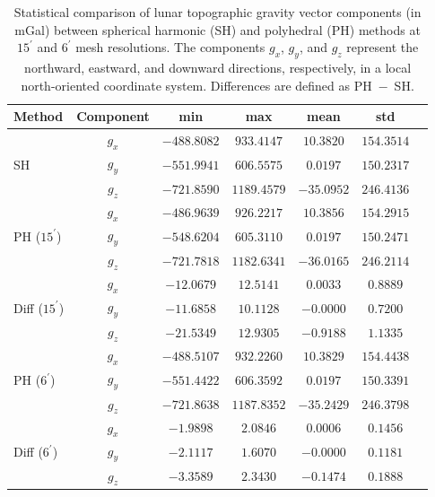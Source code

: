 \documentclass{seg}
\begin{document}
\clearpage
\begin{table}[h!]
\centering
\caption{Statistical comparison of lunar topographic gravity vector components (in mGal) between spherical harmonic (SH) and polyhedral (PH) methods at $15^{\prime}$ and $6^{\prime}$ mesh resolutions. The components $g_x$, $g_y$, and $g_z$ represent the northward, eastward, and downward directions, respectively, in a local north-oriented coordinate system. Differences are defined as PH~$-$~SH.}
\label{tab:Moon_SH_PH_comparison}
\begin{tabular}{lcccccc}
\toprule
Method & Component & min & max & mean & std \\
\midrule
\multirow{3}{*}{SH} 
   & $g_x$ & $-488.8082$ & $933.4147$ & $10.3820$ & $154.3514$ \\
   & $g_y$ & $-551.9941$ & $606.5575$ & $0.0197$  & $150.2317$ \\
   & $g_z$ & $-721.8590$ & $1189.4579$ & $-35.0952$ & $246.4136$ \\
\midrule
\multirow{3}{*}{PH ($15^{\prime}$)} 
   & $g_x$ & $-486.9639$ & $926.2217$ & $10.3856$ & $154.2915$ \\
   & $g_y$ & $-548.6204$ & $605.3110$ & $0.0197$  & $150.2471$ \\
   & $g_z$ & $-721.7818$ & $1182.6341$ & $-36.0165$ & $246.2114$ \\
\midrule
\multirow{3}{*}{Diff ($15^{\prime}$)} 
   & $g_x$ & $-12.0679$ & $12.5141$ & $0.0033$ & $0.8889$ \\
   & $g_y$ & $-11.6858$ & $10.1128$ & $-0.0000$ & $0.7200$ \\
   & $g_z$ & $-21.5349$ & $12.9305$ & $-0.9188$ & $1.1335$ \\
\midrule
\multirow{3}{*}{PH ($6^{\prime}$)} 
   & $g_x$ & $-488.5107$ & $932.2260$ & $10.3829$ & $154.4438$ \\
   & $g_y$ & $-551.4422$ & $606.3592$ & $0.0197$  & $150.3391$ \\
   & $g_z$ & $-721.8638$ & $1187.8352$ & $-35.2429$ & $246.3798$ \\
\midrule
\multirow{3}{*}{Diff ($6^{\prime}$)} 
   & $g_x$ & $-1.9898$ & $2.0846$ & $0.0006$ & $0.1456$ \\
   & $g_y$ & $-2.1117$ & $1.6070$ & $-0.0000$ & $0.1181$ \\
   & $g_z$ & $-3.3589$ & $2.3430$ & $-0.1474$ & $0.1888$ \\
\bottomrule
\end{tabular}
\end{table}

\clearpage


\end{document}
